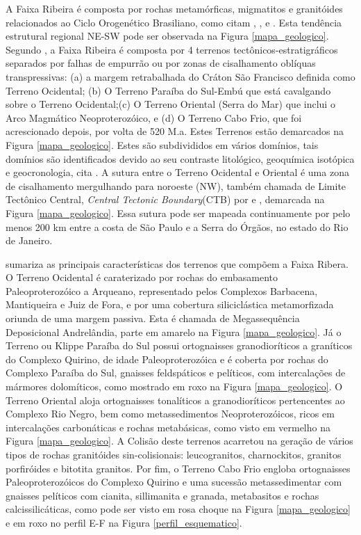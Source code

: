 A Faixa Ribeira é composta por rochas metamórficas, migmatitos e granitóides relacionados ao Ciclo Orogenético Brasiliano, como citam \cite{kuhn_metamorphic_2004}, \cite{heilbron_evolution_2010}, \cite{valeriano_u_pb_2011} e \cite{heilbron_serra_2013}. Esta tendência estrutural regional NE-SW pode ser observada na Figura \ref{mapa_geologico}. Segundo \cite{heilbron_evolution_2010}, a Faixa Ribeira é composta por 4 terrenos tectônicos-estratigráficos separados por falhas de empurrão ou por zonas de cisalhamento oblíquas transpressivas: (a) a margem retrabalhada do Cráton São Francisco definida como Terreno Ocidental; (b) O Terreno Paraíba do Sul-Embú que está cavalgando sobre o Terreno Ocidental;(c) O Terreno Oriental (Serra do Mar) que inclui o Arco Magmático Neoproterozóico, e (d) O Terreno Cabo Frio, que foi acrescionado depois, por volta de 520 M.a. Estes Terrenos estão demarcados na Figura \ref{mapa_geologico}. Estes são subdivididos em vários domínios, tais domínios são identificados devido ao seu contraste litológico, geoquímica isotópica e geocronologia, cita \cite{kuhn_metamorphic_2004}. A sutura entre o Terreno Ocidental e Oriental é uma zona de cisalhamento mergulhando para noroeste (NW), também chamada de Limite Tectônico Central, \textit{Central Tectonic Boundary}(CTB) por \cite{heilbron_evolution_2010} e \cite{trouw_new_2013}, demarcada na Figura \ref{mapa_geologico}. Essa sutura pode ser mapeada continuamente por pelo menos 200 km entre a costa de São Paulo e a Serra do Órgãos, no estado do Rio de Janeiro. 

\cite{trouw_new_2013} sumariza as principais características dos terrenos que compõem a Faixa Ribera. O Terreno Ocidental é caraterizado por rochas do embasamento Paleoproterozóico a Arqueano, representado pelos Complexos Barbacena, Mantiqueira e Juiz de Fora, e por uma cobertura siliciclástica metamorfizada oriunda de uma margem passiva. Esta é chamada de Megassequência Deposicional Andrelândia, parte em amarelo na Figura \ref{mapa_geologico}. Já o Terreno ou Klippe Paraíba do Sul possui ortognaisses granodioríticos a graníticos do Complexo Quirino, de idade Paleoproterozóica e é coberta por rochas do Complexo Paraíba do Sul, gnaisses feldspáticos e pelíticos, com intercalações de mármores dolomíticos, como mostrado em roxo na Figura \ref{mapa_geologico}. O Terreno Oriental aloja ortognaisses tonalíticos a granodioríticos pertencentes ao Complexo Rio Negro, bem como metassedimentos Neoproterozóicos, ricos em intercalações carbonáticas e rochas metabásicas, como visto em vermelho na Figura \ref{mapa_geologico}. A Colisão deste terrenos acarretou na geração de vários tipos de rochas granitóides sin-colisionais: leucogranitos, charnockitos, granitos porfiróides e bitotita granitos. Por fim, o Terreno Cabo Frio engloba ortognaisses Paleoproterozóicos do Complexo Quirino e uma sucessão metassedimentar com gnaisses pelíticos com cianita, sillimanita e granada, metabasitos e rochas calcissilicáticas, como pode ser visto em rosa choque na Figura \ref{mapa_geologico} e em roxo no perfil E-F na Figura \ref{perfil_esquematico}.
